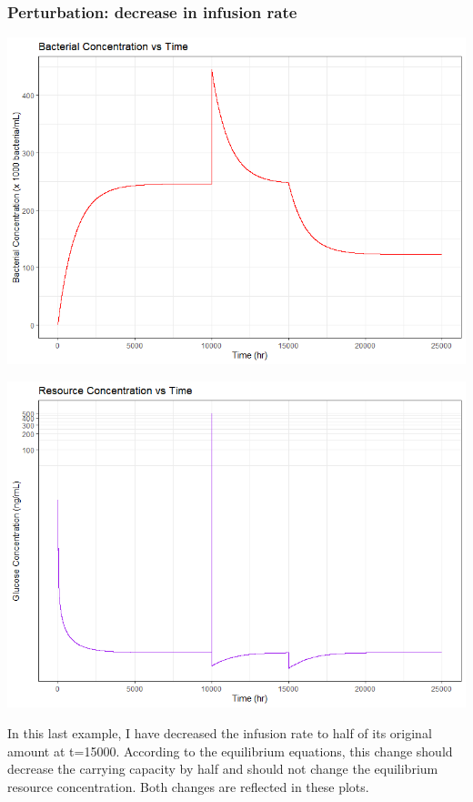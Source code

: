 \documentclass{article}
\begin{document}
\begin{center}
\subsubsection{Perturbation: decrease in infusion rate}

\includegraphics[scale=0.5]{plots/NoPhage_U_perturbed_down.png}

\includegraphics[scale=0.5]{plots/NoPhage_R_perturbed_down.png}
\end{center}

In this last example, I have decreased the infusion rate to half of its original amount at t=15000. According to the equilibrium equations, this change should decrease the carrying capacity by half and should not change the equilibrium resource concentration. Both changes are reflected in these plots.
\end{document}
